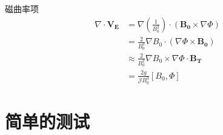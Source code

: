 \documentclass[11pt,a4paper]{article}
\begin{document}
磁曲率项
$$
\begin{aligned}
\nabla\cdot{\pmb{V_E}} 
&= \nabla(\frac{1}{B_0^2})\cdot(\pmb{B_0}\times\nabla\Phi) \\
&= \frac{2}{B_0^3}\nabla{B_0}\cdot(\nabla\Phi\times\pmb{B_0}) \\
&\approx \frac{2}{B_0^2}\nabla{B_0}\times\nabla\Phi\cdot\pmb{B_T}    \\
&= \frac{2g}{\mathcal{J}B_0^3}[B_0,\Phi]  
\end{aligned}
$$

\section{简单的测试}
\end{document}
